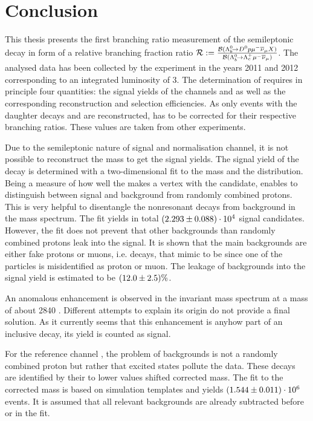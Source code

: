 \chapter{Conclusion}
\label{sec:Conclusion}
This thesis presents the first branching ratio measurement of the semileptonic decay \LbToDpmunuX in form of a relative branching fraction ratio $\mathcal{R} := \frac{{\cal B}({{\Lambda}^0_{b}}\!\rightarrow {\ensuremath{{D}^0}}{\ensuremath{p}}{\ensuremath{\mu^-}}{\ensuremath{{\overline{\nu}}_\mu}} X)}{{\cal B}({{\Lambda}^0_{b}}\!\rightarrow {\ensuremath{{\Lambda}^+_{c}}}{\ensuremath{\mu^-}}{\ensuremath{{\overline{\nu}}_\mu}})}$.
The analysed data has been collected by the \lhcb experiment in the years 2011 and 2012 corresponding to an integrated luminosity of 3\invfb.
The determination of \R requires in principle four quantities: the signal yields of the channels \LbToDpmunuX and \LbToLcmunu as well as the corresponding reconstruction and selection efficiencies.
As only events with the daughter decays \DToKpi and \LcTopKpi are reconstructed, \R has to be corrected for their respective branching ratios.
These values are taken from other experiments.

Due to the semileptonic nature of signal and normalisation channel, it is not possible to reconstruct the \Lb mass to get the signal yields.
The signal yield of the decay \LbToDpmunuX is determined with a two-dimensional fit to the \Dz\proton mass and the \logIP distribution.
Being a measure of how well the \proton makes a vertex with the \Dz\mun candidate, \logIP enables to distinguish between signal and background from randomly combined protons.
This is very helpful to disentangle the nonresonant \LbToDpmunuX decays from background in the \Dz\proton mass spectrum.
The fit yields in total $(2.293 \pm 0.088)\cdot 10^{4}$ signal candidates.
However, the fit does not prevent that other backgrounds than randomly combined protons leak into the signal.
It is shown that the main backgrounds are either fake protons or muons, i.e. decays, that mimic to be \LbToDpmunuX since one of the particles is misidentified as proton or muon.
The leakage of backgrounds into the signal yield is estimated to be $(12.0 \pm 2.5)\%$.

An anomalous enhancement is observed in the invariant \Dz\proton mass spectrum at a mass of about 2840 \mev.
Different attempts to explain its origin do not provide a final solution.
As it currently seems that this enhancement is anyhow part of an inclusive \LbToDpmunuX decay, its yield is counted as signal.

For the reference channel \LbToLcmunu, the problem of backgrounds is not a randomly combined proton but rather that excited \Lcstar states pollute the data.
These decays are identified by their to lower values shifted corrected \Lb mass.
The fit to the corrected mass is based on simulation templates and yields $(1.544 \pm 0.011)\cdot 10^{6}$ \LbToLcmunu events.
It is assumed that all relevant backgrounds are already subtracted before or in the fit.

